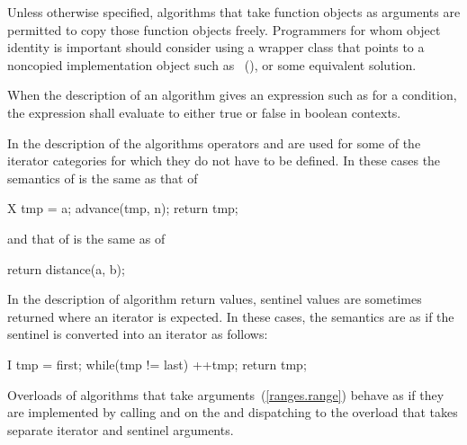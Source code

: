 \pnum
\enternote
Unless otherwise specified, algorithms that take function objects as arguments
are permitted to copy those function objects freely. Programmers for whom object
identity is important should consider using a wrapper class that points to a
noncopied implementation object such as ~(), or some equivalent solution.
\exitnote

\begin{removedblock}
\pnum
When the description of an algorithm gives an expression such as
for a condition, the expression shall evaluate to
either true or false in boolean contexts.
\end{removedblock}

\pnum
In the description of the algorithms operators
\tcode{+}
and
\tcode{-}
are used for some of the iterator categories for which
they do not have to be defined.
In these cases the semantics of
is the same as that of

\begin{codeblock}
X tmp = a;
advance(tmp, n);
return tmp;
\end{codeblock}

and that of
is the same as of

\begin{codeblock}
return distance(a, b);
\end{codeblock}

\begin{addedblock}
\pnum
In the description of algorithm return values, sentinel values are sometimes
returned where an iterator is expected. In these cases, the semantics are as
if the sentinel is converted into an iterator as follows:

\begin{codeblock}
I tmp = first;
while(tmp != last)
  ++tmp;
return tmp;
\end{codeblock}

\pnum
Overloads of algorithms that take  arguments~(\ref{ranges.range})
behave as if they are implemented by calling  and  on
the  and dispatching to the overload that takes separate
iterator and sentinel arguments.
\end{addedblock}


